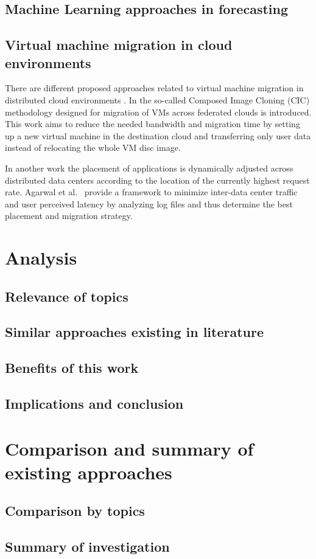 \subsection{Machine Learning approaches in forecasting}

\subsection{Virtual machine migration in cloud environments}

There are different proposed approaches related to virtual machine migration in distributed cloud environments \cite{celesti2010improving, malet2010resource}. In \cite{celesti2010improving} the so-called Composed Image Cloning (CIC) methodology designed for migration of VMs across federated clouds is introduced. This work aims to reduce the needed bandwidth and migration time by setting up a new virtual machine in the destination cloud and transferring only user data instead of relocating the whole VM disc image. 

In another work \cite{malet2010resource} the placement of applications is dynamically adjusted across distributed data centers according to the location of the currently highest request rate. Agarwal et al.~\cite{agarwal2010volley} provide a framework to minimize inter-data center traffic and user perceived latency by analyzing log files and thus determine the best placement and migration strategy. 



\section{Analysis}

\subsection{Relevance of topics}

\subsection{Similar approaches existing in literature}

\subsection{Benefits of this work}

\subsection{Implications and conclusion}


\section{Comparison and summary of existing approaches}

\subsection{Comparison by topics}

\subsection{Summary of investigation}


